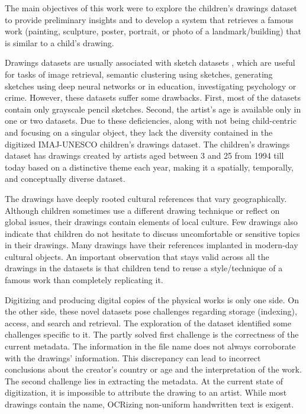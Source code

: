 The main objectives of this work were to explore the children's drawings dataset to provide preliminary insights and to develop a system that retrieves a famous work (painting, sculpture, poster, portrait, or photo of a landmark/building) that is similar to a child's drawing.

Drawings datasets are usually associated with sketch datasets \cite{eitz2012hdhso, jongejan2016quick, Patsorn2016SketchyDatabase, Konyushkova2015GodsKD}, which are useful for tasks of image retrieval, semantic clustering using sketches, generating sketches using deep neural networks or in education, investigating psychology or crime. However, these datasets suffer some drawbacks. First, most of the datasets contain only grayscale pencil sketches. Second, the artist's age is available only in one or two datasets. Due to these deficiencies, along with not being child-centric and focusing on a singular object, they lack the diversity contained in the digitized IMAJ-UNESCO children's drawings dataset. The children's drawings dataset has drawings created by artists aged between 3 and 25 from 1994 till today based on a distinctive theme each year, making it a spatially, temporally, and conceptually diverse dataset. 

The drawings have deeply rooted cultural references that vary geographically. Although children sometimes use a different drawing technique or reflect on global issues, their drawings contain elements of local culture. Few drawings also indicate that children do not hesitate to discuss uncomfortable or sensitive topics in their drawings. Many drawings have their references implanted in modern-day cultural objects. An important observation that stays valid across all the drawings in the datasets is that children tend to reuse a style/technique of a famous work than completely replicating it.

Digitizing and producing digital copies of the physical works is only one side. On the other side, these novel datasets pose challenges regarding storage (indexing), access, and search and retrieval. The exploration of the dataset identified some challenges specific to it. The partly solved first challenge is the correctness of the current metadata. The information in the file name does not always corroborate with the drawings' information. This discrepancy can lead to incorrect conclusions about the creator's country or age and the interpretation of the work. The second challenge lies in extracting the metadata. At the current state of digitization, it is impossible to attribute the drawing to an artist. While most drawings contain the name, OCRizing non-uniform handwritten text is exigent.

